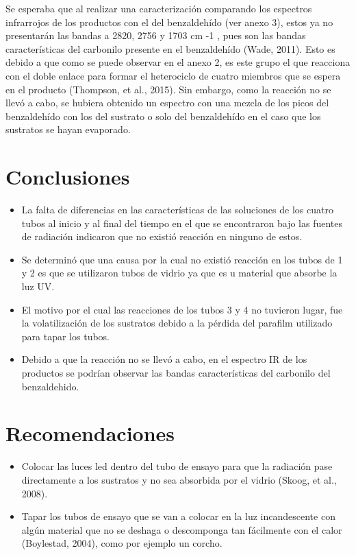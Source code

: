 \documentclass[12pt,letterpaper, onecolumn]{article}
\begin{document}
\begin{multicols}{2}
Se   esperaba   que   al   realizar   una caracterización  comparando los  espectros infrarrojos   de   los   productos   con   el   del benzaldehído  (ver  anexo  3),  estos  ya  no presentarán   las   bandas   a   2820,  2756  y 1703   cm -1 ,   pues   son   las   bandas características   del  carbonilo  presente  en el   benzaldehído (Wade,   2011).  Esto  es debido  a  que  como  se  puede  observar  en el  anexo  2,  es  este  grupo  el  que  reacciona con   el   doble enlace   para   formar   el heterociclo   de   cuatro   miembros   que se espera  en  el  producto  (Thompson,  et  al., 2015).  Sin  embargo,  como  la  reacción  no se  llevó  a  cabo,  se  hubiera  obtenido  un espectro  con  una  mezcla  de  los  picos  del benzaldehído  con  los  del  sustrato  o  solo del   benzaldehído   en el   caso   que   los sustratos   se   hayan   evaporado.  

\section{Conclusiones}

\begin{itemize}
    \item La   falta de diferencias en las características   de   las soluciones de   los   cuatro   tubos   al  inicio  y  al final del tiempo  en  el  que se encontraron   bajo   las   fuentes de radiación  indicaron  que  no  existió reacción   en   ninguno   de estos. 
    \item Se determinó que una causa por la cual no existió reacción en los tubos de 1 y 2 es que se utilizaron tubos de vidrio ya que es u material que absorbe la luz UV.
    \item El motivo por el cual las reacciones de los tubos 3 y 4 no tuvieron lugar, fue la volatilización de los sustratos debido a la pérdida del parafilm utilizado para tapar los tubos.
    \item Debido a que la reacción no se llevó a cabo, en el espectro IR de los productos se podrían observar las bandas características del carbonilo del benzaldehido.
\end{itemize}

\section{Recomendaciones}

\begin{itemize}
    \item Colocar las luces led dentro del tubo de ensayo para que la radiación pase directamente a los sustratos y no sea absorbida por el vidrio (Skoog, et al., 2008).
    \item Tapar los tubos de ensayo que se van a colocar en la luz incandescente con algún material que no se deshaga o descomponga tan fácilmente con el calor (Boylestad, 2004), como por ejemplo un corcho.
\end{itemize}

\end{multicols}
\balance
\end{document}
